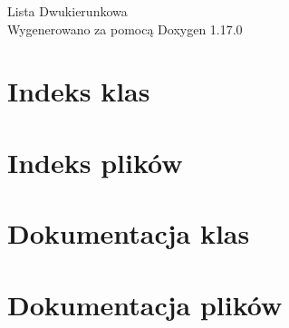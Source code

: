 \documentclass[twoside]{book}
\newcommand{\+}{\discretionary{\mbox{\scriptsize$\hookleftarrow$}}{}{}}
\newcommand{\clearemptydoublepage}{%
    \newpage{\pagestyle{empty}\cleardoublepage}%
  }
\begin{document}
  \raggedbottom
    \hypersetup{pageanchor=false,
                bookmarksnumbered=true,
                pdfencoding=unicode
               }
  \begin{titlepage}
  \vspace*{7cm}
  \begin{center}%
  {\Large Lista Dwukierunkowa}\\
  \vspace*{1cm}
  {\large Wygenerowano za pomocą Doxygen 1.17.0}\\
  \end{center}
  \end{titlepage}
  \clearemptydoublepage
  \tableofcontents
  \clearemptydoublepage
  \hypersetup{pageanchor=true}
\chapter{Indeks klas}

\chapter{Indeks plików}

\chapter{Dokumentacja klas}




\chapter{Dokumentacja plików}






  \backmatter
  \newpage
  \clearemptydoublepage
  \printindex
\end{document}
